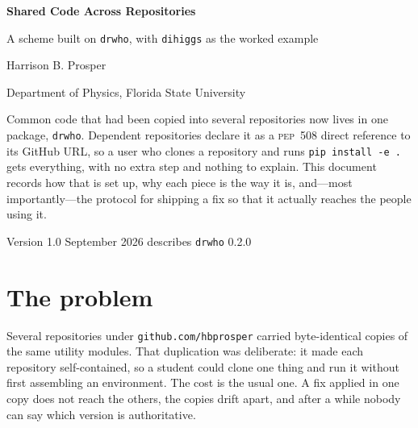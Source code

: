 \documentclass[11pt,a4paper]{article}
\newcommand{\pkg}[1]{\texttt{#1}}
\begin{document}
\begin{titlepage}
\centering
\vspace*{3.5cm}
{\sffamily\Huge\bfseries\color{accent} Shared Code Across Repositories\par}
\vspace{0.8cm}
{\sffamily\Large A scheme built on \texttt{drwho}, with \texttt{dihiggs} as the worked example\par}
\vspace{2.2cm}
{\large Harrison B. Prosper\par}
\vspace{0.3cm}
{\normalsize Department of Physics, Florida State University\par}
\vspace{2.5cm}
\begin{minipage}{0.8\textwidth}
\small
\begin{notebox}[Summary]
Common code that had been copied into several repositories now lives in one
package, \pkg{drwho}. Dependent repositories declare it as a \textsc{pep}~508
direct reference to its GitHub URL, so a user who clones a repository and runs
\texttt{pip install -e .} gets everything, with no extra step and nothing to
explain. This document records how that is set up, why each piece is the way it
is, and---most importantly---the protocol for shipping a fix so that it actually
reaches the people using it.
\end{notebox}
\end{minipage}
\vfill
{\small Version 1.0 \quad\textbullet{} September 2026 \quad\textbullet\quad
describes \pkg{drwho} 0.2.0\par}
\end{titlepage}

\tableofcontents
\thispagestyle{empty}
\clearpage
\setcounter{page}{1}

\section{The problem}

Several repositories under \texttt{github.com/hbprosper} carried byte-identical
copies of the same utility modules. That duplication was deliberate: it made each
repository self-contained, so a student could clone one thing and run it without
first assembling an environment. The cost is the usual one. A fix applied in one
copy does not reach the others, the copies drift apart, and after a while nobody
can say which version is authoritative.
\end{document}
